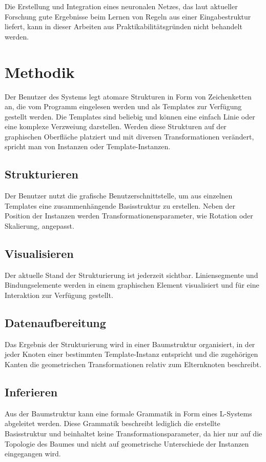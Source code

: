 Die Erstellung und Integration eines neuronalen Netzes, das laut aktueller Forschung gute Ergebnisse beim Lernen von
Regeln aus einer Eingabestruktur liefert, kann in dieser Arbeiten aus Praktikabilitätsgründen nicht behandelt werden.

\section{Methodik}
Der Benutzer des Systems legt atomare Strukturen in Form von Zeichenketten an, die vom Programm eingelesen werden und
als Templates zur Verfügung gestellt werden.
Die Templates sind beliebig und können eine einfach Linie oder eine komplexe Verzweiung darstellen.
Werden diese Strukturen auf der graphischen Oberfläche platziert und mit diversen Transformationen verändert, spricht man
von Instanzen oder Template-Instanzen.

\subsection*{Strukturieren}
Der Benutzer nutzt die grafische Benutzerschnittstelle, um aus einzelnen Templates eine zusammenhängende Basisstruktur zu
erstellen.
Neben der Position der Instanzen werden Transformationensparameter, wie Rotation oder Skalierung, angepasst.

\subsection*{Visualisieren}
Der aktuelle Stand der Strukturierung ist jederzeit sichtbar.
Liniensegmente und Bindungselemente werden in einem graphischen Element visualisiert und für eine Interaktion zur Verfügung
gestellt.

\subsection*{Datenaufbereitung}
Das Ergebnis der Strukturierung wird in einer Baumstruktur
organisiert, in der jeder Knoten einer bestimmten Template-Instanz entspricht und die zugehörigen Kanten die
geometrischen Transformationen relativ zum Elternknoten beschreibt.

\subsection*{Inferieren}
Aus der Baumstruktur kann eine formale Grammatik in Form eines L-Systems abgeleitet werden.
Diese Grammatik beschreibt lediglich die erstellte Basisstruktur und beinhaltet keine Transformationsparameter, da hier
nur auf die Topologie des Baumes und nicht auf geometrische Unterschiede der Instanzen eingegangen wird.

